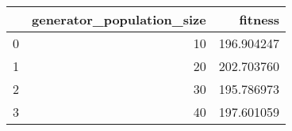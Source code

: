 \begin{tabular}{lrr}
\toprule
{} &  generator\_population\_size &     fitness \\
\midrule
0 &                         10 &  196.904247 \\
1 &                         20 &  202.703760 \\
2 &                         30 &  195.786973 \\
3 &                         40 &  197.601059 \\
\bottomrule
\end{tabular}
